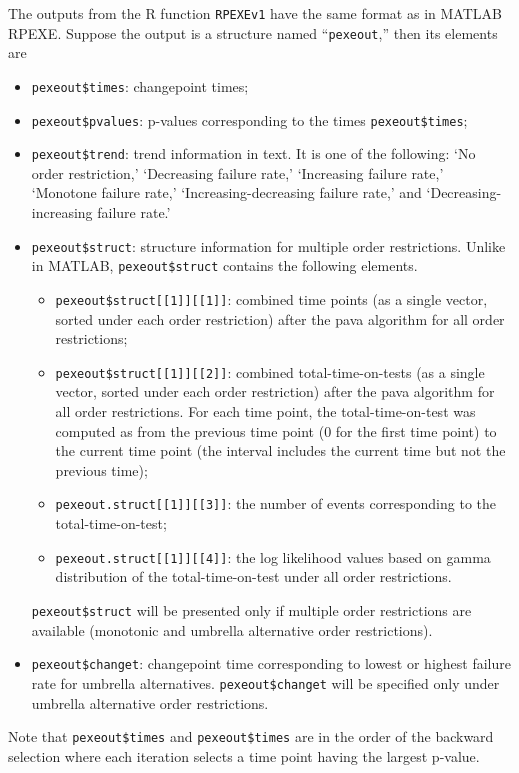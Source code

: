 \documentclass[12pt] {article}
\begin{document}
The outputs from the R function {\tt RPEXEv1}
have the same format as in MATLAB RPEXE. Suppose the output is a
structure named ``{\tt pexeout},'' then its elements are
\begin{itemize}
\item {\tt pexeout\$times}: changepoint times;
\item {\tt pexeout\$pvalues}: p-values corresponding to the times {\tt pexeout\$times};
\item {\tt pexeout\$trend}:  trend information in text. It is one of the following: `No order restriction,' `Decreasing failure rate,' `Increasing failure rate,' `Monotone failure rate,' `Increasing-decreasing failure rate,'  and `Decreasing-increasing failure rate.'
\item {\tt pexeout\$struct}:  structure information for multiple order restrictions.
    Unlike in MATLAB, {\tt pexeout\$struct} contains the following elements.
    \begin{itemize}
        \item {\tt pexeout\$struct[[1]][[1]]}: combined time points (as a single vector, sorted under each order restriction) after the pava algorithm for all order restrictions;
        \item {\tt pexeout\$struct[[1]][[2]]}: combined total-time-on-tests  (as a single vector, sorted under each order restriction) after the pava algorithm for all order restrictions. For each time point, the total-time-on-test was computed as from the previous time point (0 for the first time point) to the current time point (the interval includes the current time but not the previous time);
        \item {\tt pexeout.struct[[1]][[3]]}: the number of events corresponding to the total-time-on-test;
        \item {\tt pexeout.struct[[1]][[4]]}: the log likelihood values based on gamma distribution of the total-time-on-test under all order restrictions.
    \end{itemize}
    {\tt pexeout\$struct} will be presented only if multiple order restrictions are available (monotonic and umbrella alternative order restrictions).
\item {\tt pexeout\$changet}: changepoint time corresponding to lowest or highest failure rate for umbrella alternatives.
    {\tt pexeout\$changet} will be specified only under umbrella alternative order restrictions.
\end{itemize}
Note that {\tt pexeout\$times} and {\tt pexeout\$times} are in the order of the backward selection where each iteration selects a time point having the largest p-value.
\end{document}
